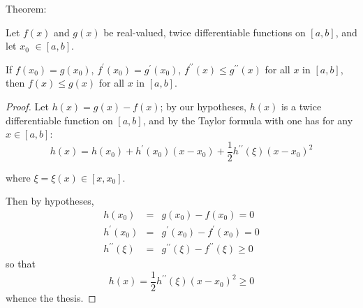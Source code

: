 \documentclass[12pt]{article}
\begin{document}
Theorem:

Let $f(x)$ and $g(x)$ be real-valued, twice differentiable
functions on $[a,b]$, and let $x_{0}$ $\in [a,b]$.

If $f(x_{0})=g(x_{0})$, $f^{\prime }(x_{0})=g^{\prime }(x_{0})$, $f^{\prime \prime }(x)\leq g^{\prime \prime }(x)$ for all $x$ in $[a,b]$, then $f(x)\leq g(x)$ for all $x$ in $[a,b]$.

\begin{proof}

Let $h(x)=g(x)-f(x)$; by our hypotheses, $h(x)$ is a twice differentiable
function on $[a,b]$, and by the Taylor formula with  one has for any $x\in [a,b]$:
\[
h(x)=h(x_{0})+h^{\prime }(x_{0})(x-x_{0})+\frac{1}{2}h^{\prime \prime }(\xi
)(x-x_{0})^{2}
\]

where $\xi =\xi (x)\in [x,x_{0}]$.

Then by hypotheses,
\begin{eqnarray*}
h(x_{0}) &=&g(x_{0})-f(x_{0})=0 \\
h^{\prime }(x_{0}) &=&g^{\prime }(x_{0})-f^{\prime }(x_{0})=0 \\
h^{\prime \prime }(\xi ) &=&g^{\prime \prime }(\xi )-f^{\prime \prime }(\xi
)\geq 0
\end{eqnarray*}
so that
\[
h(x)=\frac{1}{2}h^{\prime \prime }(\xi )(x-x_{0})^{2}\geq 0
\]
whence the thesis.
\end{proof}

\end{document}
